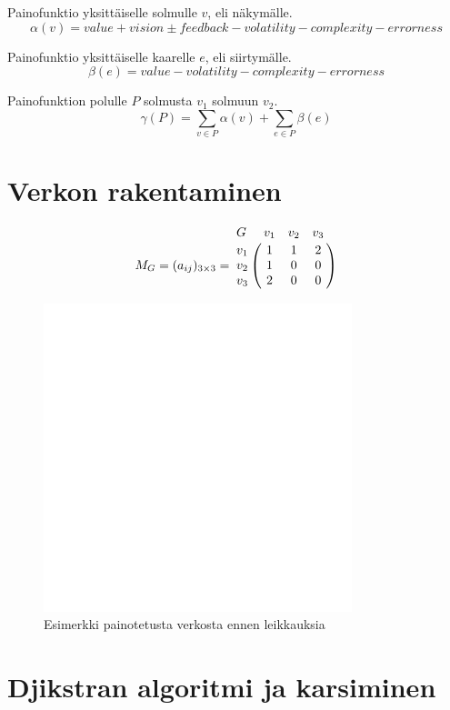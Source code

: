   Painofunktio yksittäiselle solmulle \(v\), eli näkymälle.
  \[\alpha(v) = value + vision \pm feedback - volatility - complexity - errorness\]

  Painofunktio yksittäiselle kaarelle \(e\), eli siirtymälle.
  \[\beta(e) = value - volatility - complexity - errorness\]

  Painofunktion polulle \(P\) solmusta \(v_1\) solmuun \(v_2\).
  \[\gamma(P) = \sum_{v \in P} \alpha(v) + \sum_{e \in P} \beta(e)\]

\section{Verkon rakentaminen} \label{ch:10_verkon_rakentaminen}


  \[
    M_G = (a_{ij})_{3\times3} =
    \bordermatrix{
      G & v_1 & v_2 & v_3 \cr
      v_1 & 1 & 1 & 2 \cr
      v_2 & 1 & 0 & 0 \cr
      v_3 & 2 & 0 & 0 \cr
    }
  \]

  \begin{figure}[H]
    \centering
    \includegraphics[width=0.8\textwidth]{assets/painotetun-verkon-esimerkki-ennen.png}
    \caption{Esimerkki painotetusta verkosta ennen leikkauksia}
    \label{fig:painotetun-verkon-esimerkki-ennen}
  \end{figure}

\section{Djikstran algoritmi ja karsiminen} \label{ch:10_djikstran_algoritmi_ja_karsiminen}


